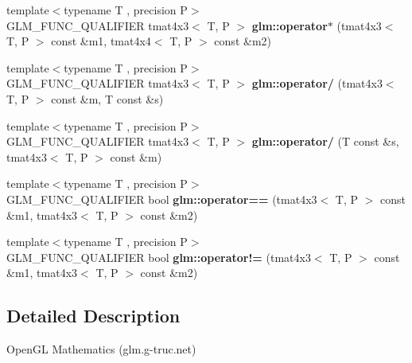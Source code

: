\begin{DoxyCompactItemize}
\item 
\hypertarget{namespaceglm_abd440e86d32d7fdf501cea387d566799}{{\footnotesize template$<$typename T , precision P$>$ }\\G\-L\-M\-\_\-\-F\-U\-N\-C\-\_\-\-Q\-U\-A\-L\-I\-F\-I\-E\-R tmat4x3$<$ T, P $>$ {\bfseries glm\-::operator$\ast$} (tmat4x3$<$ T, P $>$ const \&m1, tmat4x4$<$ T, P $>$ const \&m2)}\label{namespaceglm_abd440e86d32d7fdf501cea387d566799}

\item 
\hypertarget{namespaceglm_ae7004574df6323d999b0a1be72ac72d6}{{\footnotesize template$<$typename T , precision P$>$ }\\G\-L\-M\-\_\-\-F\-U\-N\-C\-\_\-\-Q\-U\-A\-L\-I\-F\-I\-E\-R tmat4x3$<$ T, P $>$ {\bfseries glm\-::operator/} (tmat4x3$<$ T, P $>$ const \&m, T const \&s)}\label{namespaceglm_ae7004574df6323d999b0a1be72ac72d6}

\item 
\hypertarget{namespaceglm_ad3cad8f5fbca99608719dbab6c2c3537}{{\footnotesize template$<$typename T , precision P$>$ }\\G\-L\-M\-\_\-\-F\-U\-N\-C\-\_\-\-Q\-U\-A\-L\-I\-F\-I\-E\-R tmat4x3$<$ T, P $>$ {\bfseries glm\-::operator/} (T const \&s, tmat4x3$<$ T, P $>$ const \&m)}\label{namespaceglm_ad3cad8f5fbca99608719dbab6c2c3537}

\item 
\hypertarget{namespaceglm_a26d8f492037c0d9932f3dcdc1f5ad329}{{\footnotesize template$<$typename T , precision P$>$ }\\G\-L\-M\-\_\-\-F\-U\-N\-C\-\_\-\-Q\-U\-A\-L\-I\-F\-I\-E\-R bool {\bfseries glm\-::operator==} (tmat4x3$<$ T, P $>$ const \&m1, tmat4x3$<$ T, P $>$ const \&m2)}\label{namespaceglm_a26d8f492037c0d9932f3dcdc1f5ad329}

\item 
\hypertarget{namespaceglm_ab5df48e5151769b6a258c2c3f2699e9c}{{\footnotesize template$<$typename T , precision P$>$ }\\G\-L\-M\-\_\-\-F\-U\-N\-C\-\_\-\-Q\-U\-A\-L\-I\-F\-I\-E\-R bool {\bfseries glm\-::operator!=} (tmat4x3$<$ T, P $>$ const \&m1, tmat4x3$<$ T, P $>$ const \&m2)}\label{namespaceglm_ab5df48e5151769b6a258c2c3f2699e9c}

\end{DoxyCompactItemize}


\subsection{Detailed Description}
Open\-G\-L Mathematics (glm.\-g-\/truc.\-net)

